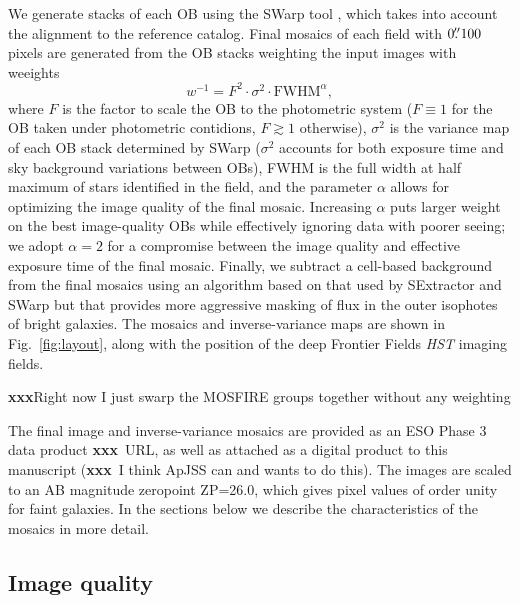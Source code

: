 \documentclass[iop, numberedappendix]{emulateapj}
\gdef\xxx{\textbf{xxx}}
\begin{document}
We generate stacks of each OB using the SWarp tool \citep{swarp}, which takes into account the alignment to the reference catalog.  Final mosaics of each field with $0\mbox{$.\!\!^{\prime\prime}$}100$ pixels are generated from the OB stacks weighting the input images with weeights
\[
w^{-1} = F^2\cdot\sigma^2 \cdot \mathrm{FWHM}^\alpha, 
\]
where $F$ is the factor to scale the OB to the photometric system ($F\equiv1$ for the OB taken under photometric contidions, $F\gtrsim1$ otherwise), $\sigma^2$ is the variance map of each OB stack determined by SWarp ($\sigma^2$ accounts for both exposure time and sky background variations between OBs), FWHM is the full width at half maximum of stars identified in the field, and the parameter $\alpha$ allows for optimizing the image quality of the final mosaic.  Increasing $\alpha$ puts larger weight on the best image-quality OBs while effectively ignoring data with poorer seeing; we adopt $\alpha=2$ for a compromise between the image quality and effective exposure time of the final mosaic.  Finally, we subtract a cell-based background from the final mosaics using an algorithm based on that used by SExtractor and SWarp but that provides more aggressive masking of flux in the outer isophotes of bright galaxies. The mosaics and inverse-variance maps are shown in Fig.~\ref{fig:layout}, along with the position of the deep Frontier Fields \textit{HST} imaging fields.

\xxx Right now I just swarp the MOSFIRE groups together without any weighting

The final image and inverse-variance mosaics are provided as an ESO Phase 3 data product \xxx\ URL, as well as attached as a digital product to this manuscript (\xxx\ I think ApJSS can and wants to do this).  The images are scaled to an AB magnitude zeropoint ZP=26.0, which gives pixel values of order unity for faint galaxies.  In the sections below we describe the characteristics of the mosaics in more detail.  

\subsection{Image quality}
\label{s:fwhm}
\end{document}
